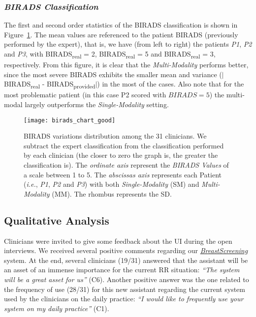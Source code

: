 \subsubsection{\textit{BIRADS Classification}}

The first and second order statistics of the BIRADS classification is shown in Figure~\ref{fig:birads_chart}.
The mean values are referenced to the patient BIRADS (previously performed by the expert), that is, we have (from left to right) the patients \textit{P1}, \textit{P2} and \textit{P3}, with BIRADS\textsubscript{real} = 2, BIRADS\textsubscript{real} = 5 and BIRADS\textsubscript{real} = 3, respectively.
From this figure, it is clear that the \textit{Multi-Modality} performs better, since the most severe BIRADS exhibits the smaller mean and variance ($|$BIRADS\textsubscript{real} - BIRADS\textsubscript{provided}$|$) in the most of the cases. Also note that for the most problematic patient (in this case P2 scored with $BIRADS=5$) the multi-modal largely outperforms the \textit{Single-Modality} setting.

\begin{figure}[ht]
\centering
\texttt{[image: birads\_chart\_good]}
\caption{\scriptsize BIRADS variations distribution among the 31 clinicians.
We subtract the expert classification from the classification performed by each clinician
(the closer to zero the graph is, the greater the classification is). The \textit{ordinate axis} represent the \textit{BIRADS Values} of a scale between 1 to 5.
The \textit{abscissas axis} represents each Patient ({\em i.e.}, \textit{P1}, \textit{P2} and \textit{P3}) with both \textit{Single-Modality} (SM) and \textit{Multi-Modality} (MM).
The rhombus represents the SD.}
\label{fig:birads_chart}
\end{figure}

\subsection{Qualitative Analysis}

Clinicians were invited to give some feedback about the UI during the open interviews.
We received several positive comments regarding our \href{https://breastscreening.github.io/}{{\it BreastScreening}} system.
At the end, several clinicians (19/31) answered that the assistant will be an asset of an immense importance for the current RR situation:
\textit{``The system will be a great asset for us''} (C6).
Another positive answer was the one related to the frequency of use (28/31) for this new assistant regarding the current system used by the clinicians on the daily practice:
\textit{``I would like to frequently use your system on my daily practice''} (C1).